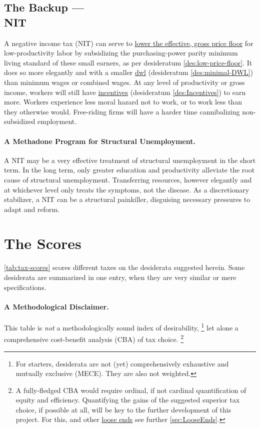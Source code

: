 \subsection[Negative Income Tax]{The Backup ---\\NIT}
	\label{sec:ScoreNIT}
A negative income tax (NIT) can serve to \hyperref[des:low-price-floor]{lower the effective, gross price floor} for low-productivity labor by subsidizing the purchasing-power parity minimum living standard of these small earners, as per desideratum \ref{des:low-price-floor}.
It does so more elegantly and with a smaller \hyperref[des:minimal-DWL]{dwl} (desideratum \ref{des:minimal-DWL}) than minimum wages or combined wages.
At any level of productivity or gross income, workers will still have \hyperref[des:Incentives]{incentives} (desideratum \ref{des:Incentives}) to earn more.
Workers experience less moral hazard not to work, or to work less than they otherwise would.
Free-riding firms will have a harder time cannibalizing non-subsidized employment.

\paragraph{A Methadone Program for Structural Unemployment.}
A NIT may be a very effective treatment of structural unemployment in the short term.
In the long term, only greater education and productivity alleviate the root cause of structural unemployment.
Transferring resources, however elegantly and at whichever level only treats the symptoms, not the disease.
As a discretionary stabilizer, a NIT can be a structural painkiller, disguising necessary pressures to adapt and reform.
\clearpage

\section{The Scores}
	\label{sec:Scores}

\autoref{tab:tax-scores} scores different taxes on the desiderata suggested herein.
Some desiderata are summarized in one entry, when they are very similar or mere specifications.

\paragraph{A Methodological Disclaimer.}
This table is \emph{not} a methodologically sound index of desirability,
\footnote{
	For starters, desiderata are not (yet) comprehensively exhaustive and mutually exclusive (MECE).
	They are also not weighted.
}
let alone a comprehensive cost-benefit analysis (CBA) of tax choice.
\footnote{
	A fully-fledged CBA would require ordinal, if not cardinal quantification of equity and efficiency.
	Quantifying the gains of the suggested superior tax choice, if possible at all, will be key to the further development of this project.
	For this, and other \hyperref[sec:LooseEnds]{loose ends} see further \autoref{sec:LooseEnds}.
}

